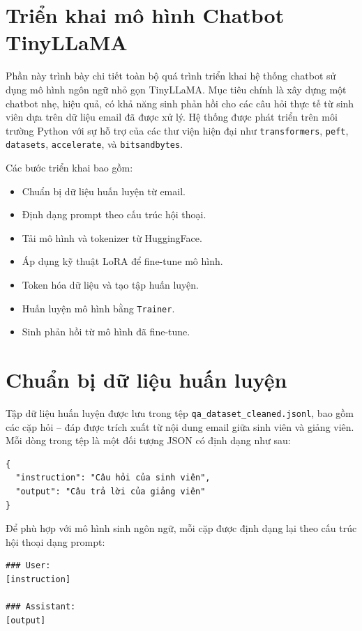 \documentclass[../DoAn.tex]{subfiles}
\begin{document}
\section{Triển khai mô hình Chatbot TinyLLaMA}

Phần này trình bày chi tiết toàn bộ quá trình triển khai hệ thống chatbot sử dụng mô hình ngôn ngữ nhỏ gọn TinyLLaMA. Mục tiêu chính là xây dựng một chatbot nhẹ, hiệu quả, có khả năng sinh phản hồi cho các câu hỏi thực tế từ sinh viên dựa trên dữ liệu email đã được xử lý. Hệ thống được phát triển trên môi trường Python với sự hỗ trợ của các thư viện hiện đại như \texttt{transformers}, \texttt{peft}, \texttt{datasets}, \texttt{accelerate}, và \texttt{bitsandbytes}.

Các bước triển khai bao gồm:
\begin{itemize}
    \item Chuẩn bị dữ liệu huấn luyện từ email.
    \item Định dạng prompt theo cấu trúc hội thoại.
    \item Tải mô hình và tokenizer từ HuggingFace.
    \item Áp dụng kỹ thuật LoRA để fine-tune mô hình.
    \item Token hóa dữ liệu và tạo tập huấn luyện.
    \item Huấn luyện mô hình bằng \texttt{Trainer}.
    \item Sinh phản hồi từ mô hình đã fine-tune.
\end{itemize}

\section{Chuẩn bị dữ liệu huấn luyện}

Tập dữ liệu huấn luyện được lưu trong tệp \texttt{qa\_dataset\_cleaned.jsonl}, bao gồm các cặp hỏi – đáp được trích xuất từ nội dung email giữa sinh viên và giảng viên. Mỗi dòng trong tệp là một đối tượng JSON có định dạng như sau:

\begin{verbatim}
{
  "instruction": "Câu hỏi của sinh viên",
  "output": "Câu trả lời của giảng viên"
}
\end{verbatim}

Để phù hợp với mô hình sinh ngôn ngữ, mỗi cặp được định dạng lại theo cấu trúc hội thoại dạng prompt:

\begin{lstlisting}
### User:
[instruction]

### Assistant:
[output]
\end{lstlisting}
\end{document}
